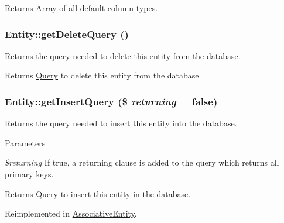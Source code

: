 \begin{DoxyReturn}{Returns}
Array of all default column types. 
\end{DoxyReturn}
\hypertarget{classEntity_a9ebe24129b06509e5dc66e75c3df5396}{
\subsubsection[{getDeleteQuery}]{\setlength{\rightskip}{0pt plus 5cm}Entity::getDeleteQuery ()}}
\label{classEntity_a9ebe24129b06509e5dc66e75c3df5396}
Returns the query needed to delete this entity from the database.

\begin{DoxyReturn}{Returns}
\hyperlink{classQuery}{Query} to delete this entity from the database. 
\end{DoxyReturn}
\hypertarget{classEntity_a48b7255175241170f98b9f2601243b48}{
\subsubsection[{getInsertQuery}]{\setlength{\rightskip}{0pt plus 5cm}Entity::getInsertQuery (\$ {\em returning} = {\ttfamily false})}}
\label{classEntity_a48b7255175241170f98b9f2601243b48}
Returns the query needed to insert this entity into the database.


\begin{DoxyParams}{Parameters}
\item[{\em \$returning}]If true, a returning clause is added to the query which returns all primary keys.\end{DoxyParams}
\begin{DoxyReturn}{Returns}
\hyperlink{classQuery}{Query} to insert this entity in the database. 
\end{DoxyReturn}


Reimplemented in \hyperlink{classAssociativeEntity_a52105f0a9a643c01e92d6acc4dfafef3}{AssociativeEntity}.

